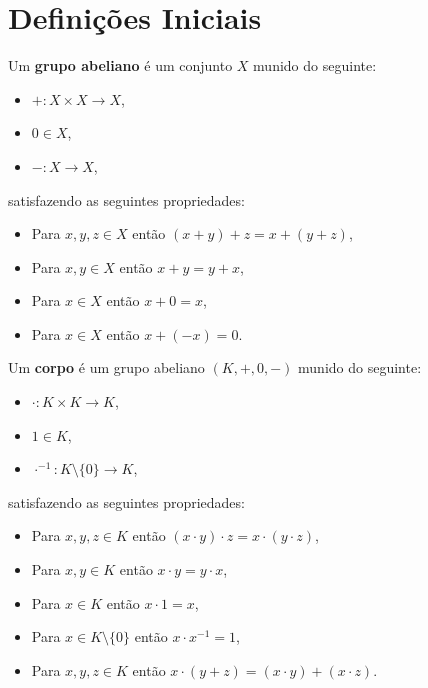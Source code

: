 \documentclass[11pt,twoside,a4paper]{book}
\begin{document}
\section{Definições Iniciais}

\begin{definicao}
Um \textbf{grupo abeliano} é um conjunto $X$ munido do seguinte:
\begin{itemize}
\item $+:X\times X\rightarrow X$,
\item $0\in X$,
\item $-:X\rightarrow X$,
\end{itemize}
satisfazendo as seguintes propriedades:
\begin{itemize}
\item Para $x,y,z\in X$ então $(x+y)+z=x+(y+z)$,
\item Para $x,y\in X$ então $x+y=y+x$,
\item Para $x\in X$ então $x+0=x$,
\item Para $x\in X$ então $x+(-x)=0$.
\end{itemize}
\end{definicao}

\begin{definicao}
Um \textbf{corpo} é um grupo abeliano $(K,+,0,-)$ munido do seguinte:
\begin{itemize}
\item $\cdot:K\times K\rightarrow K$,
\item $1\in K$,
\item $\cdot^{-1}:K\setminus\{0\}\rightarrow K$,
\end{itemize}
satisfazendo as seguintes propriedades:
\begin{itemize}
\item Para $x,y,z\in K$ então $(x\cdot y)\cdot z=x\cdot(y\cdot z)$,
\item Para $x,y\in K$ então $x\cdot y=y\cdot x$,
\item Para $x\in K$ então $x\cdot 1=x$,
\item Para $x\in K\setminus\{0\}$ então $x\cdot x^{-1}=1$,
\item Para $x,y,z\in K$ então $x\cdot(y+z)=(x\cdot y)+(x\cdot z)$.
\end{itemize}
\end{definicao}
\end{document}

